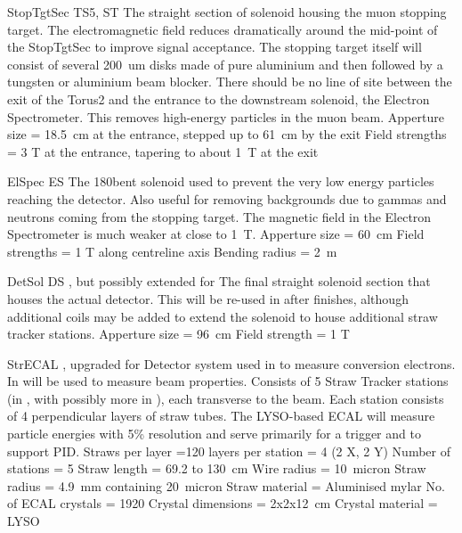 {StopTgtSec}
{TS5, ST}
{\phaseII}
{The straight section of solenoid housing the muon stopping target.  The electromagnetic field reduces dramatically around the mid-point of the StopTgtSec to improve signal acceptance.  The stopping target itself will consist of several 200~um disks made of pure aluminium and then followed by a tungsten or aluminium beam blocker.  There should be no line of site between the exit of the Torus2 and the entrance to the downstream solenoid, the Electron Spectrometer.  This removes high-energy particles in the muon beam.}
{Apperture size = 18.5~cm at the entrance, stepped up to  61~cm by the exit\newline%
 Field strengths = 3 T at the entrance, tapering to about 1~T at the exit\vspace{1.5cm}}

{ElSpec}
{ES}
{\phaseII}
{The 180\degree bent solenoid used to prevent the very low energy particles reaching the detector.  Also useful for removing backgrounds due to gammas and neutrons coming from the stopping target.  The magnetic field in the Electron Spectrometer is much weaker at close to 1~T.}
{Apperture size = 60~cm\newline%
 Field strengths = 1 T along centreline axis\newline%
 Bending radius = 2~m}

{DetSol}
{DS}
{\phaseI, but possibly extended for \phaseII}
{The final straight solenoid section that houses the actual detector.  This will be re-used in \phaseII after \phaseI finishes, although additional coils may be added to extend the solenoid to house additional straw tracker stations.  }
{Apperture size = 96~cm\newline%
 Field strength = 1 T}

{StrECAL}
{}
{\phaseI, upgraded for \phaseII}
{Detector system used in \phaseII to measure conversion electrons.   In \phaseI will be used to measure beam properties.  Consists of 5 Straw Tracker stations (in \phaseI, with possibly more in \phaseII), each transverse to the beam.  Each station consists of 4 perpendicular layers of straw tubes.  The LYSO-based ECAL will measure particle energies with 5\% resolution and serve primarily for a trigger and to support PID.}
{Straws per layer =120\newline%
 layers per station  = 4 (2 X, 2 Y)\newline%
 Number of stations = 5\newline%
 Straw length = 69.2 to 130~cm\newline%
 Wire radius = 10~micron\newline%
 Straw radius = 4.9~mm containing 20~micron\newline%
 Straw material = Aluminised mylar\newline%
 No. of ECAL crystals = 1920 Crystal\newline%
 dimensions = 2x2x12~cm\newline%
 Crystal material = LYSO \vspace{-1cm}}

